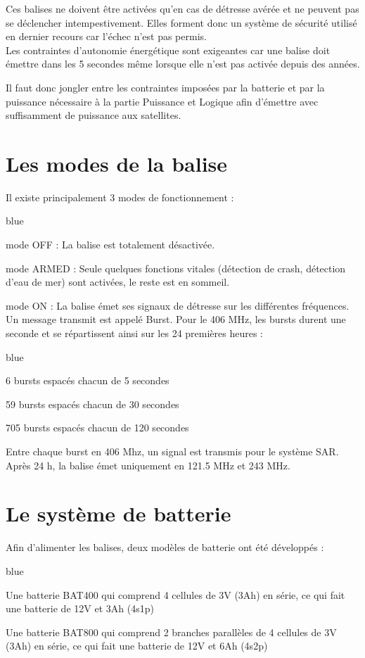 
Ces balises ne doivent être activées qu'en cas de détresse avérée et ne peuvent pas se déclencher intempestivement. Elles forment donc un système de sécurité utilisé en dernier recours car l'échec n'est pas permis.\\
Les contraintes d'autonomie énergétique sont exigeantes car une balise doit émettre dans les 5 secondes même lorsque elle n'est pas activée depuis des années.


Il faut donc jongler entre les contraintes imposées par la batterie et par la puissance nécessaire à la partie Puissance et Logique afin d'émettre avec suffisamment de puissance aux satellites. 

\section{Les modes de la balise}
\label{frequencies}

Il existe principalement 3 modes de fonctionnement :

\begin{items}{blue}{\Circle}
    \item mode OFF : La balise est totalement désactivée.
    \item mode ARMED : Seule quelques fonctions vitales (détection de crash, détection d'eau de mer) sont activées, le reste est en sommeil.
    \item mode ON : La balise émet ses signaux de détresse sur les différentes fréquences. Un message transmit est appelé Burst. Pour le 406 MHz, les bursts durent une seconde et se répartissent ainsi sur les 24 premières heures : 
     \begin{items}{blue}{\Triangle}
 \item 6 bursts espacés chacun de 5 secondes
 \item 59 bursts espacés chacun de 30 secondes
 \item 705 bursts espacés chacun de 120 secondes
 \end{items}
 
 Entre chaque burst en 406 Mhz, un signal est transmis pour le système SAR. Après 24 h, la balise émet uniquement en 121.5 MHz et 243 MHz.
\end{items}

\section{Le système de batterie}

Afin d'alimenter les balises, deux modèles de batterie ont été développés : 

\begin{items}{blue}{\Circle}
 \item Une batterie BAT400 qui comprend 4 cellules de 3V (3Ah) en série, ce qui fait une batterie de 12V et 3Ah (4s1p)
 \item Une batterie BAT800 qui comprend 2 branches parallèles de 4 cellules de 3V (3Ah) en série, ce qui fait une batterie de 12V et 6Ah (4s2p)
 \end{items}